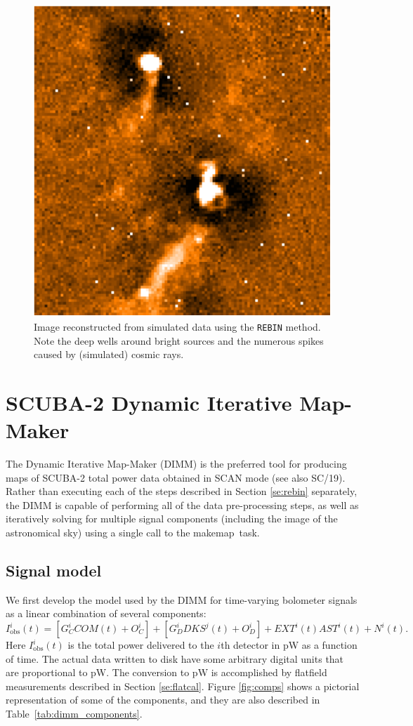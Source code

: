 \documentclass[twoside,11pt]{article}
\newcommand{\xref}[3]{#1}
\newcommand{\xlabel}[1]{}
\renewcommand{\_}{\texttt{\symbol{95}}}
\newcommand{\SMURFcook}{\xref{SC/19}{sc19}{}}
\newcommand{\task}[1]{\textsf{#1}}
\newcommand{\makemap}{\xref{\task{makemap}}{sun258}{MAKEMAP}}
\newcommand{\aparam}[1]{\texttt{#1}}     %
\begin{document}
\begin{figure}[htb]
  \begin{center}
    \includegraphics[width=0.7\linewidth]{sun258_rebinmap}
    \caption{Image reconstructed from simulated data using the
      \aparam{REBIN} method. Note the deep wells around bright
      sources and the numerous spikes caused by (simulated) cosmic
      rays.}
    \label{fig:rebinmap}
  \end{center}
\end{figure}

\section{\xlabel{dimm}SCUBA-2 Dynamic Iterative Map-Maker\label{se:dimm}}

The Dynamic Iterative Map-Maker (DIMM) is the preferred tool for
producing maps of SCUBA-2 total power data obtained in SCAN
mode\cite{sc2ana006} (see also \SMURFcook). Rather than executing each
of the steps described in Section \ref{se:rebin} separately, the DIMM
is capable of performing all of the data pre-processing steps, as well
as iteratively solving for multiple signal components (including the
image of the astronomical sky) using a single call to the \makemap\
task.

\subsection{Signal model}

We first develop the model used by the DIMM for time-varying bolometer
signals as a linear combination of several components:
%
\begin{equation}
I^i_{\mathrm{obs}}(t) = [G_C^i COM(t) + O_C^i] + [G_D^i DKS^j(t) + O_D^i] +
                      EXT^i(t) AST^i(t) + N^i(t).
\end{equation}
%
Here $I^i_{\mathrm{obs}}(t)$ is the total power delivered to the $i$th
detector in pW as a function of time. The actual data written to disk
have some arbitrary digital units that are proportional to pW. The
conversion to pW is accomplished by flatfield measurements described
in Section \ref{se:flatcal}. Figure \ref{fig:comps} shows a pictorial
representation of some of the components, and they are also described
in Table~\ref{tab:dimm_components}.
\end{document}
